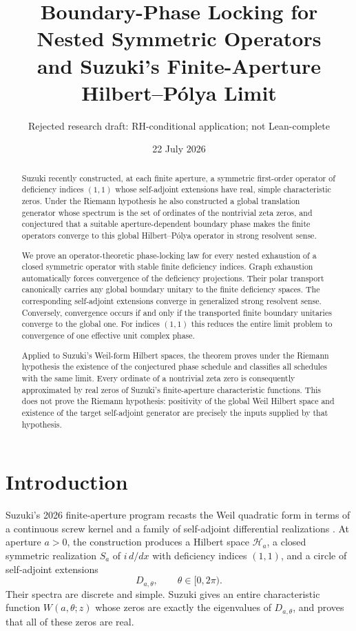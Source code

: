 \documentclass[11pt]{article}
\title{Boundary-Phase Locking for Nested Symmetric Operators\\
and Suzuki's Finite-Aperture Hilbert--P\'olya Limit}
\author{Rejected research draft: RH-conditional application; not Lean-complete}
\date{22 July 2026}
\theoremstyle{remark}
\newcommand{\Hh}{\mathcal H}
\begin{document}
\maketitle

\begin{abstract}
Suzuki recently constructed, at each finite aperture, a symmetric first-order operator of
deficiency indices $(1,1)$ whose self-adjoint extensions have real, simple characteristic zeros.
Under the Riemann hypothesis he also constructed a global translation generator whose spectrum is
the set of ordinates of the nontrivial zeta zeros, and conjectured that a suitable aperture-dependent
boundary phase makes the finite operators converge to this global Hilbert--P\'olya operator in
strong resolvent sense.

We prove an operator-theoretic phase-locking law for every nested exhaustion of a closed symmetric
operator with stable finite deficiency indices.  Graph exhaustion automatically forces convergence
of the deficiency projections.  Their polar transport canonically carries any global boundary
unitary to the finite deficiency spaces.  The corresponding self-adjoint extensions converge in
generalized strong resolvent sense.  Conversely, convergence occurs if and only if the transported
finite boundary unitaries converge to the global one.  For indices $(1,1)$ this reduces the entire
limit problem to convergence of one effective unit complex phase.

Applied to Suzuki's Weil-form Hilbert spaces, the theorem proves under the Riemann hypothesis the
existence of the conjectured phase schedule and classifies all schedules with the same limit.  Every
ordinate of a nontrivial zeta zero is consequently approximated by real zeros of Suzuki's
finite-aperture characteristic functions.  This does not prove the Riemann hypothesis: positivity
of the global Weil Hilbert space and existence of the target self-adjoint generator are precisely
the inputs supplied by that hypothesis.
\end{abstract}

\section{Introduction}

Suzuki's 2026 finite-aperture program recasts the Weil quadratic form in terms of a continuous screw
kernel and a family of self-adjoint differential realizations \cite{Suzuki2026}.  At aperture
$a>0$, the construction produces a Hilbert space $\Hh_a$, a closed symmetric realization $S_a$ of
$i\,d/dx$ with deficiency indices $(1,1)$, and a circle of self-adjoint extensions
\[
 D_{a,\theta},\qquad \theta\in[0,2\pi).
\]
Their spectra are discrete and simple.  Suzuki gives an entire characteristic function
$W(a,\theta;z)$ whose zeros are exactly the eigenvalues of $D_{a,\theta}$, and proves that all of
these zeros are real.
\end{document}
